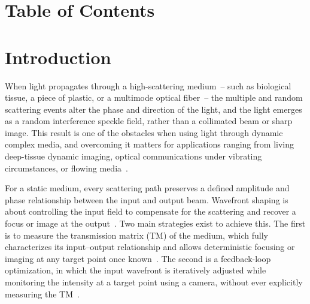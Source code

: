 \documentclass[11pt, twoside]{article}
\begin{document}
\section*{\fontsize{14}{16}\bfseries\centering Table of Contents}
\renewcommand{\contentsname}{}
\tableofcontents

\newpage

\setcounter{page}{1}

\fancyfoot[C]{\thepage}

\cleardoublepage

\section{Introduction}
\label{sec:introduction}

When light propagates through a high-scattering medium~-- such as biological tissue, a piece of plastic, or a multimode optical fiber~-- the multiple and random scattering events alter the phase and direction of the light, and the light emerges as a random interference speckle field, rather than a collimated beam or sharp image. This result is one of the obstacles when using light through dynamic complex media, and overcoming it matters for applications ranging from living deep-tissue dynamic imaging, optical communications under vibrating circumstances, or flowing media~\cite{vellekoop2007focusing,mididoddi2025threading}.

For a static medium, every scattering path preserves a defined amplitude and phase relationship between the input and output beam. Wavefront shaping is about controlling the input field to compensate for the scattering and recover a focus or image at the output~\cite{vellekoop2007focusing}. Two main strategies exist to achieve this. The first is to measure the transmission matrix (TM) of the medium, which fully characterizes its input--output relationship and allows deterministic focusing or imaging at any target point once known~\cite{popoff2010measuring}. The second is a feedback-loop optimization, in which the input wavefront is iteratively adjusted while monitoring the intensity at a target point using a camera, without ever explicitly measuring the TM~\cite{vellekoop2007focusing}.
\end{document}
